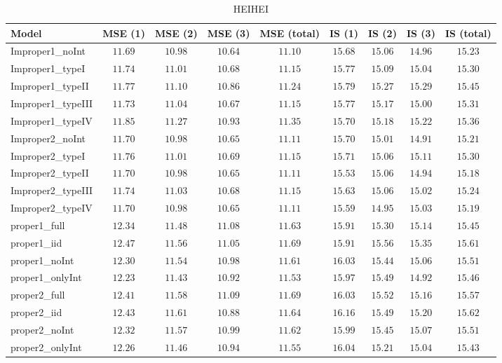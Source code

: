 \begin{table}

\caption{\label{tab:model-choice-sc7}HEIHEI}
\centering
\begin{tabular}{lcccccccc}
\hline
Model  & MSE (1) & MSE (2) & MSE (3) & MSE (total) & IS (1) & IS (2) & IS (3) & \multicolumn{1}{c}{IS (total)} \\ 
\hline
Improper1_noInt  & $11.69$ & $10.98$ & $10.64$ & $11.10$ & $15.68$ & $15.06$ & $14.96$ & $15.23$ \\
Improper1_typeI  & $11.74$ & $11.01$ & $10.68$ & $11.15$ & $15.77$ & $15.09$ & $15.04$ & $15.30$ \\
Improper1_typeII  & $11.77$ & $11.10$ & $10.86$ & $11.24$ & $15.79$ & $15.27$ & $15.29$ & $15.45$ \\
Improper1_typeIII  & $11.73$ & $11.04$ & $10.67$ & $11.15$ & $15.77$ & $15.17$ & $15.00$ & $15.31$ \\
Improper1_typeIV  & $11.85$ & $11.27$ & $10.93$ & $11.35$ & $15.70$ & $15.18$ & $15.22$ & $15.36$ \\
Improper2_noInt  & $11.70$ & $10.98$ & $10.65$ & $11.11$ & $15.70$ & $15.01$ & $14.91$ & $15.21$ \\
Improper2_typeI  & $11.76$ & $11.01$ & $10.69$ & $11.15$ & $15.71$ & $15.06$ & $15.11$ & $15.30$ \\
Improper2_typeII  & $11.70$ & $10.98$ & $10.65$ & $11.11$ & $15.53$ & $15.06$ & $14.94$ & $15.18$ \\
Improper2_typeIII  & $11.74$ & $11.03$ & $10.68$ & $11.15$ & $15.63$ & $15.06$ & $15.02$ & $15.24$ \\
Improper2_typeIV  & $11.70$ & $10.98$ & $10.65$ & $11.11$ & $15.59$ & $14.95$ & $15.03$ & $15.19$ \\
proper1_full  & $12.34$ & $11.48$ & $11.08$ & $11.63$ & $15.91$ & $15.30$ & $15.14$ & $15.45$ \\
proper1_iid  & $12.47$ & $11.56$ & $11.05$ & $11.69$ & $15.91$ & $15.56$ & $15.35$ & $15.61$ \\
proper1_noInt  & $12.30$ & $11.54$ & $10.98$ & $11.61$ & $16.03$ & $15.44$ & $15.06$ & $15.51$ \\
proper1_onlyInt  & $12.23$ & $11.43$ & $10.92$ & $11.53$ & $15.97$ & $15.49$ & $14.92$ & $15.46$ \\
proper2_full  & $12.41$ & $11.58$ & $11.09$ & $11.69$ & $16.03$ & $15.52$ & $15.16$ & $15.57$ \\
proper2_iid  & $12.43$ & $11.61$ & $10.88$ & $11.64$ & $16.16$ & $15.49$ & $15.20$ & $15.62$ \\
proper2_noInt  & $12.32$ & $11.57$ & $10.99$ & $11.62$ & $15.99$ & $15.45$ & $15.07$ & $15.51$ \\
proper2_onlyInt  & $12.26$ & $11.46$ & $10.94$ & $11.55$ & $16.04$ & $15.21$ & $15.04$ & $15.43$ \\
\hline 
\end{tabular}


\end{table}